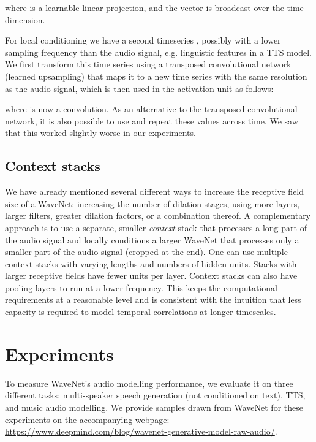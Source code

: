 \documentclass{article}
\makeatletter
\newcommand*{\eg}{e.g.\@\xspace}
\makeatother
\begin{document}
where  is a learnable linear projection, and the vector  is broadcast over the time dimension.

For local conditioning we have a second timeseries , possibly with a lower sampling frequency than the audio signal, \eg linguistic features in a TTS model. We first transform this time series using a transposed convolutional network (learned upsampling) that maps it to a new time series  with the same resolution as the audio signal, which is then used in the activation unit as follows:

where  is now a  convolution. As an alternative to the transposed convolutional network, it is also possible to use  and repeat these values across time. We saw that this worked slightly worse in our experiments.

\subsection{Context stacks}

We have already mentioned several different ways to increase the receptive field size of a WaveNet: increasing the number of dilation stages, using more layers, larger filters, greater dilation factors, or a combination thereof. A complementary approach is to use a separate, smaller \emph{context} stack that processes a long part of the audio signal and locally conditions a larger WaveNet that processes only a smaller part of the audio signal (cropped at the end). One can use multiple context stacks with varying lengths and numbers of hidden units. Stacks with larger receptive fields have fewer units per layer. Context stacks can also have pooling layers to run at a lower frequency. This keeps the computational requirements at a reasonable level and is consistent with the intuition that less capacity is required to model temporal correlations at longer timescales.
 
\section{Experiments}

To measure WaveNet's audio modelling performance, we evaluate it on three different tasks: multi-speaker speech generation (not conditioned on text), TTS, and music audio modelling. We provide samples drawn from WaveNet for these experiments on the accompanying webpage:\\ \url{https://www.deepmind.com/blog/wavenet-generative-model-raw-audio/}.
\end{document}
